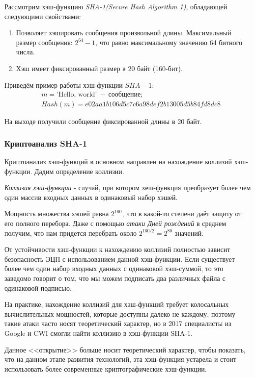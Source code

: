 Рассмотрим хэш-функцию \emph{SHA-1(Secure Hash Algorithm 1)}, обладающей следующими свойствами:
\begin{enumerate}
	\item Позволяет хэшировать сообщения произвольной длины. Максимальный размер сообщения: $2^{64} - 1$, что равно максимальному значению 64 битного числа.
	\item Хэш имеет фиксированный размер в 20 байт (160-бит).
\end{enumerate}

Приведём пример работы хэш-функции $SHA-1$:
\begin{align*}
	& m = \text{'Hello, world'}\  - \  \text{сообщение}; \\
	& Hash(m) = e02aa1b106d5c7c6a98def2b13005d5b84fd8dc8
\end{align*}

На выходе получили сообщение фиксированной длины в 20 байт.

\subsubsection{Криптоанализ SHA-1}

Криптоанализ хэш-функций в основном направлен на нахождение коллизий хэш-функции. Дадим определение коллизии.

\emph{Коллизия хэш-функции} - случай, при котором хеш-функция преобразует более чем один массив входных данных в одинаковый набор хэшей. 

Мощность множества хэшей равна $2^{160}$, что в какой-то степени даёт защиту от его полного перебора.
Даже с помощью \emph{атаки Дней рождений} в среднем получим, что нам придется перебрать около $2^{160/2} = 2^{80}$ значений.

От устойчивости хэш-функции к нахождению коллизий полностью зависит безопасность ЭЦП с использованием данной хэш-функции.
Если существует более чем один набор входных данных с одинаковой хэш-суммой, то это заведомо говорит о том, что мы можем подписать два различных файла с
одинаковой подписью.

На практике, нахождение коллизий для хэш-функций требует колосальных вычислительных мощностей, которые доступны далеко не каждому, поэтому такие атаки часто носят теоретический характер,
но в 2017 специалисты из Google и CWI смогли найти коллизию в хэш-функции SHA-1.\cite{SHA1Collision}

Данное <<открытие>> больше носит теоретический характер, чтобы показать, что на данном этапе развития технологий, эта хэш-функция устарела и стоит использовать более современные криптографические хэш-функции.

